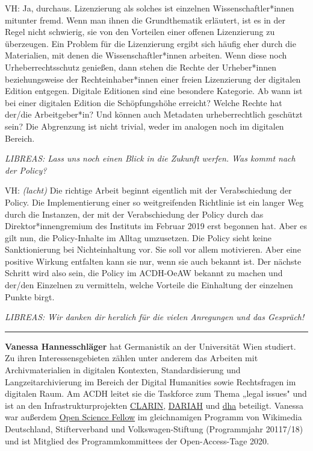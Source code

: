 \documentclass[a4paper,
fontsize=11pt,
oneside,
numbers=noperiodatend,
parskip=half-,
bibliography=totoc,
final
]{scrartcl}
\begin{document}
VH: Ja, durchaus. Lizenzierung als solches ist einzelnen
Wissenschaftler*innen mitunter fremd. Wenn man ihnen die Grundthematik
erläutert, ist es in der Regel nicht schwierig, sie von den Vorteilen
einer offenen Lizenzierung zu überzeugen. Ein Problem für die
Lizenzierung ergibt sich häufig eher durch die Materialien, mit denen
die Wissenschaftler*innen arbeiten. Wenn diese noch Urheberrechtsschutz
genießen, dann stehen die Rechte der Urheber*innen beziehungsweise der
Rechteinhaber*innen einer freien Lizenzierung der digitalen Edition
entgegen. Digitale Editionen sind eine besondere Kategorie. Ab wann ist
bei einer digitalen Edition die Schöpfungshöhe erreicht? Welche Rechte
hat der/die Arbeitgeber*in? Und können auch Metadaten urheberrechtlich
geschützt sein? Die Abgrenzung ist nicht trivial, weder im analogen noch
im digitalen Bereich.

\emph{LIBREAS: Lass uns noch einen Blick in die Zukunft werfen. Was
kommt nach der Policy?}

VH: \emph{(lacht)} Die richtige Arbeit beginnt eigentlich mit der
Verabschiedung der Policy. Die Implementierung einer so weitgreifenden
Richtlinie ist ein langer Weg durch die Instanzen, der mit der
Verabschiedung der Policy durch das Direktor*innengremium des Instituts
im Februar 2019 erst begonnen hat. Aber es gilt nun, die Policy-Inhalte
im Alltag umzusetzen. Die Policy sieht keine Sanktionierung bei
Nichteinhaltung vor. Sie soll vor allem motivieren. Aber eine positive
Wirkung entfalten kann sie nur, wenn sie auch bekannt ist. Der nächste
Schritt wird also sein, die Policy im ACDH-OeAW bekannt zu machen und
der/den Einzelnen zu vermitteln, welche Vorteile die Einhaltung der
einzelnen Punkte birgt.

\emph{LIBREAS: Wir danken dir herzlich für die vielen Anregungen und das
Gespräch!}

\begin{center}\rule{0.5\linewidth}{0.5pt}\end{center}

\textbf{Vanessa Hannesschläger} hat Germanistik an der Universität Wien
studiert. Zu ihren Interessensgebieten zählen unter anderem das Arbeiten
mit Archivmaterialien in digitalen Kontexten, Standardisierung und
Langzeitarchivierung im Bereich der Digital Humanities sowie
Rechtsfragen im digitalen Raum. Am ACDH leitet sie die Taskforce zum
Thema „legal issues" und ist an den Infrastrukturprojekten
\href{https://www.oeaw.ac.at/de/acdh/projects/clarin/}{CLARIN},
\href{https://www.oeaw.ac.at/de/acdh/projects/dariah-eu/}{DARIAH} und
\href{https://www.oeaw.ac.at/de/acdh/projects/dha-digital-humanities-austria/}{dha}
beteiligt. Vanessa war außerdem
\href{https://en.wikiversity.org/wiki/Wikimedia_Deutschland/Open_Science_Fellows_Program}{Open
Science Fellow} im gleichnamigen Programm von Wikimedia Deutschland,
Stifterverband und Volkswagen-Stiftung (Programmjahr 20117/18) und ist
Mitglied des Programmkommittees der Open-Access-Tage 2020.
\end{document}
